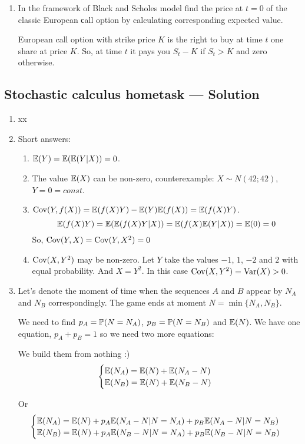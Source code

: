 \documentclass[12pt, a4paper]{article}
\begin{document}
\begin{enumerate}
\item In the framework of Black and Scholes model find the price at $t=0$ of the classic European сall option by calculating corresponding expected value.

European call option with strike price $K$ is the right to buy at time $t$ one share at price $K$. So, at time $t$ it pays you $S_t - K$ if $S_t > K$ and zero otherwise.

\end{enumerate}




\subsection{Stochastic calculus hometask — Solution}

\begin{enumerate}

\item xx
\item Short answers:

\begin{enumerate}
\item $\E(Y)=\E(\E(Y|X))=0$.
\item The value $\E(X)$ can be non-zero, counterexample: $X\sim N(42; 42)$, $Y=0=const$.
\item $\Cov(Y, f(X)) = \E(f(X)Y) - \E(Y)\E(f(X))=\E(f(X)Y)$.
\[
\E(f(X)Y)= \E(\E(f(X)Y|X))=\E(f(X)\E(Y|X))=\E(0)=0
\]
So, $\Cov(Y,X)=\Cov(Y,X^2)=0$
\item $\Cov(X, Y^2)$ may be non-zero. Let $Y$ take the values $-1$, $1$, $-2$ and $2$ with equal probability. And $X=Y^2$. In this case $\Cov(X, Y^2)=\Var(X)>0$.
\end{enumerate}

\item Let's denote the moment of time when the sequences $A$ and $B$ appear by $N_A$ and $N_B$ correspondingly. The game ends at moment $N=\min \{N_A, N_B\}$.

We need to find $p_A = \P(N=N_A)$, $p_B=\P(N=N_B)$ and $\E(N)$. We have one equation, $p_A + p_B = 1$ so we need two more equations:

We build them from nothing :)
\[
\begin{cases}
\E(N_A) = \E(N) + \E(N_A - N) \\
\E(N_B) = \E(N) + \E(N_B - N) \\
\end{cases}
\]

Or
\[
\begin{cases}
\E(N_A) = \E(N) + p_A\E(N_A - N | N=N_A) + p_B \E(N_A - N | N=N_B) \\
\E(N_B) = \E(N) + p_A\E(N_B - N | N=N_A) + p_B \E(N_B - N | N=N_B) \\
\end{cases}
\]


\end{enumerate}
\end{document}
